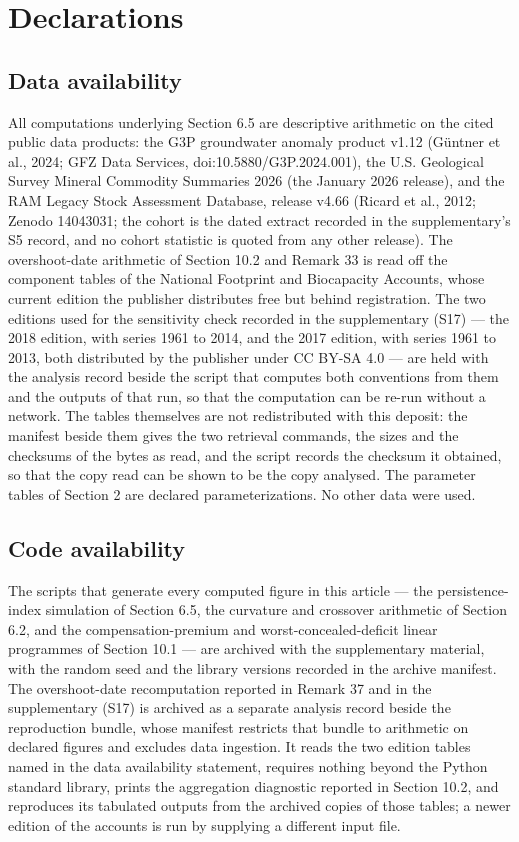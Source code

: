 \documentclass[11pt]{article}
\begin{document}
\section*{Declarations}

\subsection*{Data availability}

All computations underlying Section 6.5 are descriptive arithmetic on
the cited public data products: the G3P groundwater anomaly product
v1.12 (G\"untner et al., 2024; GFZ Data Services,
doi:10.5880/\allowbreak{}G3P.2024.001), the U.S. Geological Survey Mineral Commodity
Summaries 2026 (the January 2026 release), and the RAM Legacy Stock Assessment Database, release v4.66 (Ricard et al., 2012; Zenodo 14043031; the cohort is the
dated extract recorded in the supplementary's S5 record, and no cohort statistic is quoted from any other release). The overshoot-date arithmetic of Section 10.2 and Remark 33 is read off the component tables of the National Footprint and Biocapacity Accounts, whose current edition the publisher distributes free but behind registration. The two editions used for the sensitivity check recorded in the supplementary (S17) --- the 2018 edition, with series 1961 to 2014, and the 2017 edition, with series 1961 to 2013, both distributed by the publisher under CC BY-SA 4.0 --- are held with the analysis record beside the script that computes both conventions from them and the outputs of that run, so that the computation can be re-run without a network. The tables themselves are not redistributed with this deposit: the manifest beside them gives the two retrieval commands, the sizes and the checksums of the bytes as read, and the script records the checksum it obtained, so that the copy read can be shown to be the copy analysed. The parameter tables of Section 2 are declared parameterizations. No other data were used.

\subsection*{Code availability}
The scripts that generate every computed figure in this article --- the persistence-index simulation of Section 6.5, the curvature and crossover arithmetic of Section 6.2, and the compensation-premium and worst-concealed-deficit linear programmes of Section 10.1 --- are archived with the supplementary material, with the random seed and the library versions recorded in the archive manifest. The overshoot-date recomputation reported in Remark 37 and in the supplementary (S17) is archived as a separate analysis record beside the reproduction bundle, whose manifest restricts that bundle to arithmetic on declared figures and excludes data ingestion. It reads the two edition tables named in the data availability statement, requires nothing beyond the Python standard library, prints the aggregation diagnostic reported in Section 10.2, and reproduces its tabulated outputs from the archived copies of those tables; a newer edition of the accounts is run by supplying a different input file.
\end{document}
